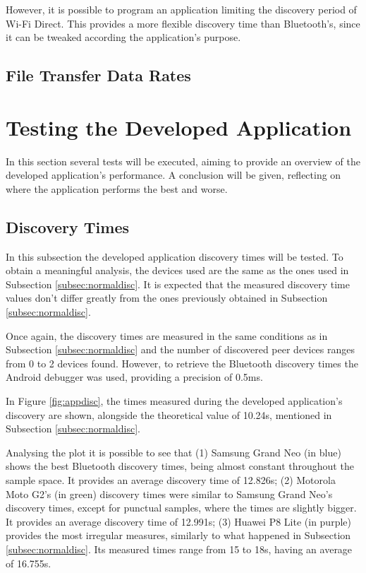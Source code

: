 However, it is possible to program an application limiting the discovery period of Wi-Fi Direct. This provides a more flexible discovery time than Bluetooth's, since it can be tweaked according the application's purpose.

\subsection{File Transfer Data Rates}
\label{subsec:normalftdr}

\section{Testing the Developed Application}

In this section several tests will be executed, aiming to provide an overview of the developed application's performance. A conclusion will be given, reflecting on where the application performs the best and worse.

\subsection{Discovery Times}
\label{subsec:appdisc}

In this subsection the developed application discovery times will be tested. To obtain a meaningful analysis, the devices used are the same as the ones used in Subsection \ref{subsec:normaldisc}. It is expected that the measured discovery time values don't differ greatly from the ones previously obtained in Subsection \ref{subsec:normaldisc}.

Once again, the discovery times are measured in the same conditions as in Subsection \ref{subsec:normaldisc} and the number of discovered peer devices ranges from 0 to 2 devices found. However, to retrieve the Bluetooth discovery times the Android debugger was used, providing a precision of 0.5ms.

In Figure \ref{fig:appdisc}, the times measured during the developed application's discovery are shown, alongside the theoretical value of 10.24s, mentioned in Subsection \ref{subsec:normaldisc}.

Analysing the plot it is possible to see that (1) Samsung Grand Neo (in blue) shows the best Bluetooth discovery times, being almost constant throughout the sample space. It provides an average discovery time of 12.826s; (2) Motorola Moto G2's (in green) discovery times were similar to Samsung Grand Neo's discovery times, except for punctual samples, where the times are slightly bigger. It provides an average discovery time of 12.991s; (3) Huawei P8 Lite (in purple) provides the most irregular measures, similarly to what happened in Subsection \ref{subsec:normaldisc}. Its measured times range from 15 to 18s, having an average of 16.755s.

